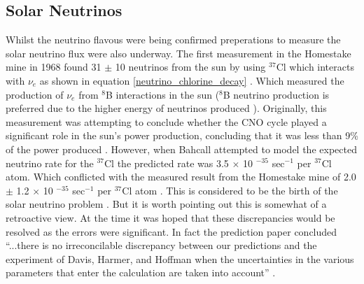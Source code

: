 \subsection{Solar Neutrinos}
Whilst the neutrino flavous were being confirmed \cite{DanbyG1962PhysRevLett.9.36} preperations to measure the solar neutrino flux were also underway. The first measurement in the Homestake mine in 1968 found 31 $\pm$ 10 neutrinos from the sun \cite{davis1968homestake} by using $^{37}$Cl which interacts with $\nu_e$ as shown in equation \ref{neutrino_chlorine_decay} \cite{Bellerive:2003rj}. Which measured the production of $\nu_e$ from $^8$B interactions in the sun ($^8$B neutrino production is preferred due to the higher energy of neutrinos produced \cite{griffiths2008neutrinoOscillations}). Originally, this measurement was attempting to conclude whether the CNO cycle played a significant role in the sun's power production, concluding that it was less than 9\% of the power produced \cite{davis1968homestake}. However, when Bahcall attempted to model the expected neutrino rate for the $^{37}$Cl the predicted rate was 3.5 $\times$ 10 $^{-35}$ sec$^{-1}$ per $^{37}$Cl atom. Which conflicted with the measured result from the Homestake mine of 2.0 $\pm$ 1.2 $\times$ 10 $^{-35}$ sec$^{-1}$ per $^{37}$Cl atom \cite{davis1968homestake}. This is considered to be the birth of the solar neutrino problem \cite{griffiths2008neutrinoOscillations}. But it is worth pointing out this is somewhat of a retroactive view. At the time it was hoped that these discrepancies would be resolved as the errors were significant. In fact the prediction paper concluded ``...there is no irreconcilable discrepancy between our predictions and the experiment of Davis, Harmer, and Hoffman when the uncertainties in the various parameters that enter the calculation are taken into account'' \cite{bahcall1968present}.
